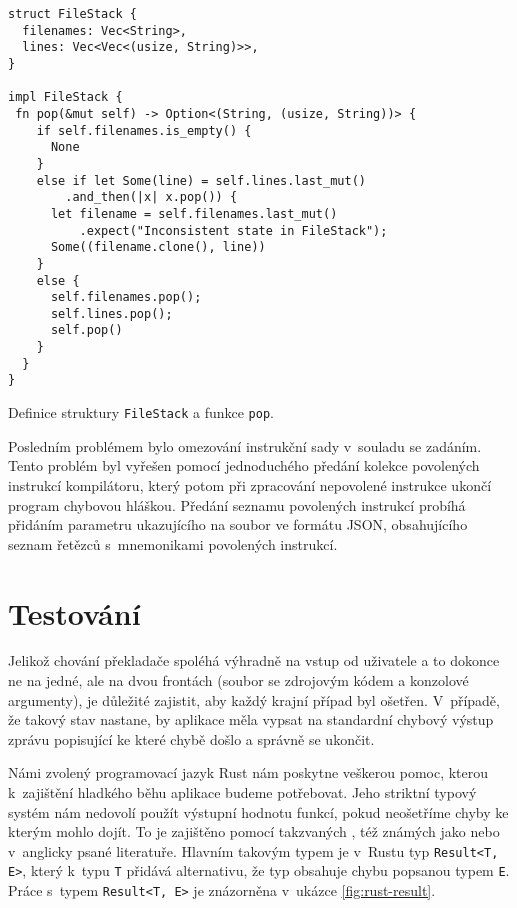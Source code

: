 \begin{listing}[htbp]
\begin{verbatim}
struct FileStack {
  filenames: Vec<String>,
  lines: Vec<Vec<(usize, String)>>,
}

impl FileStack {
 fn pop(&mut self) -> Option<(String, (usize, String))> {
    if self.filenames.is_empty() {
      None
    }
    else if let Some(line) = self.lines.last_mut()
        .and_then(|x| x.pop()) {
      let filename = self.filenames.last_mut()
          .expect("Inconsistent state in FileStack");
      Some((filename.clone(), line))
    }
    else {
      self.filenames.pop();
      self.lines.pop();
      self.pop()
    }
  }
}
\end{verbatim}
\caption{Definice struktury \texttt{FileStack} a funkce \texttt{pop}.}
\label{fig:rust-file-stack}
\end{listing}

Posledním problémem bylo omezování instrukční sady v~souladu se za\-dá\-ním. Tento problém byl vyřešen pomocí jednoduchého předání kolekce povolených instrukcí kompilátoru, který potom při zpracování nepovolené instrukce ukončí program chybovou hláškou. Předání seznamu povolených instrukcí probíhá přidáním parametru ukazujícího na soubor ve formátu JSON, obsahujícího seznam řetězců s~mnemonikami povolených instrukcí.

\section{Testování}
\label{sec:asm-test}

Jelikož chování překladače spoléhá výhradně na vstup od uživatele a to dokonce ne na jedné, ale na dvou frontách (soubor se zdrojovým kódem a konzolové argumenty), je důležité zajistit, aby každý krajní případ byl ošetřen. V~případě, že takový stav nastane, by aplikace měla vypsat na standardní chybový výstup zprávu popisující ke které chybě došlo a správně se ukončit.

Námi zvolený programovací jazyk Rust nám poskytne veškerou pomoc, kterou k~zajištění hladkého běhu aplikace budeme potřebovat. Jeho striktní typový systém nám nedovolí použít výstupní hodnotu funkcí, pokud neošetříme chyby ke kterým mohlo dojít. To je zajištěno pomocí takzvaných , též známých jako  nebo  v~anglicky psané literatuře. Hlavním takovým typem je v~Rustu typ \texttt{Result<T, E>}, který k~typu \texttt{T} přidává alternativu, že typ obsahuje chybu popsanou typem \texttt{E}. Práce s~typem \texttt{Result<T, E>} je znázorněna v~ukázce \ref{fig:rust-result}.

